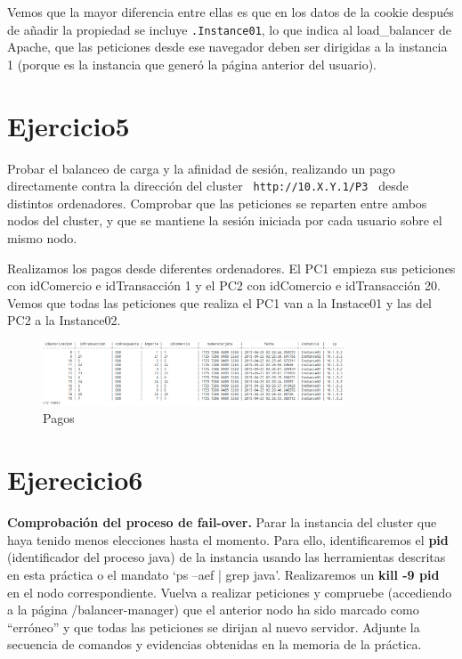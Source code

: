 \documentclass[a4paper, 10pt]{article}
\begin{document}
Vemos que la mayor diferencia entre ellas es que en los datos de la cookie después de añadir la propiedad se incluye \texttt{.Instance01}, lo que indica al load\_balancer de Apache, que las peticiones desde ese navegador deben ser dirigidas a la instancia 1 (porque es la instancia que generó la página anterior del usuario).
\newpage
\section{Ejercicio5}
\begin{mdframed}
	 Probar el balanceo de carga y la afinidad de sesión, realizando un pago directamente contra la dirección del cluster
	 \texttt{ http://10.X.Y.1/P3 }
	 desde distintos ordenadores. Comprobar que las peticiones se reparten entre ambos nodos del cluster, y
	 que se mantiene la sesión iniciada por cada usuario sobre el mismo nodo. 
\end{mdframed}

Realizamos los pagos desde diferentes ordenadores. El PC1 empieza sus peticiones con idComercio e idTransacción 1 y el PC2 con idComercio e idTransacción 20. 
Vemos que todas las peticiones que realiza el PC1 van a la Instace01 y las del PC2 a la Instance02.

\begin{figure}[hbtp]
	\centering
	\includegraphics[width=0.8\textwidth]{../../P3/pantallazos/ej5.png}
	\caption { Pagos }
\end{figure}

\newpage
\section{Ejerecicio6}
\begin{mdframed}
	\textbf{Comprobación del proceso de fail-over.} Parar la instancia del cluster que haya tenido
	menos elecciones hasta el momento. Para ello, identificaremos el \textbf{pid} (identificador del proceso java) de la
	instancia usando las herramientas descritas en esta práctica o el mandato ‘ps –aef | grep java’.
	Realizaremos un \textbf{kill -9 pid} en el nodo correspondiente. Vuelva a realizar peticiones y compruebe
	(accediendo a la página /balancer-manager) que el anterior nodo ha sido marcado como “erróneo” y que
	todas las peticiones se dirijan al nuevo servidor. Adjunte la secuencia de comandos y evidencias obtenidas
	en la memoria de la práctica. 
\end{mdframed}
\end{document}
